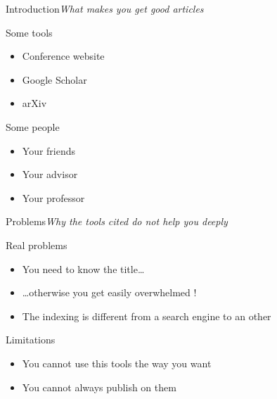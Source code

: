 


\maketitle


\begin{frame}{Introduction}{\textit{What makes you get good articles}}

\begin{block}{Some tools}
\begin{itemize}
\item Conference website
\item Google Scholar
\item arXiv
\end{itemize}
\end{block}

\begin{block}{Some people}
\begin{itemize}
\item Your friends
\item Your advisor
\item Your professor
\end{itemize}
\end{block}

\end{frame}


\begin{frame}{Problems}{\textit{Why the tools cited do not help you deeply}}

\begin{block}{Real problems}
\begin{itemize}
\item You need to know the title\ldots
\item \ldots otherwise you get easily overwhelmed !
\item The indexing is different from a search engine to an other
\end{itemize}
\end{block}

\begin{block}{Limitations}
\begin{itemize}
\item You cannot use this tools the way you want
\item You cannot always publish on them
\end{itemize}
\end{block}

\end{frame}


